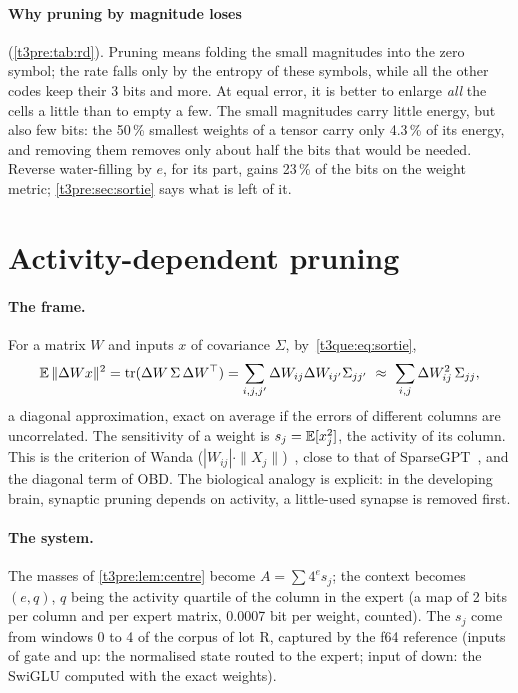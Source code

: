 \paragraph{Why pruning by magnitude loses} (\cref{t3pre:tab:rd}). Pruning means folding the small magnitudes into the zero symbol; the rate falls only by the entropy of these symbols, while all the other codes keep their 3 bits and more. At equal error, it is better to enlarge \emph{all} the cells a little than to empty a few. The small magnitudes carry little energy, but also few bits: the 50\,\% smallest weights of a tensor carry only 4.3\,\% of its energy, and removing them removes only about half the bits that would be needed. Reverse water-filling by $e$, for its part, gains 23\,\% of the bits on the weight metric; \cref{t3pre:sec:sortie} says what is left of it.

\section{Activity-dependent pruning}\label{t3pre:sec:activite}

\paragraph{The frame.} For a matrix $W$ and inputs $x$ of covariance $\Sigma$, by~\eqref{t3que:eq:sortie},
\begin{equation}\label{t3pre:eq:diag}
\E\,\|\Delta W x\|^2 = \mathrm{tr}(\Delta W\, \Sigma\, \Delta W^\top) = \sum_{i,j,j'} \Delta W_{ij}\Delta W_{ij'}\Sigma_{jj'} \ \approx\ \sum_{i,j} \Delta W_{ij}^2\, \Sigma_{jj},
\end{equation}
a diagonal approximation, exact on average if the errors of different columns are uncorrelated. The sensitivity of a weight is $s_j = \mathbb{E}[x_j^2]$, the activity of its column. This is the criterion of Wanda ($|W_{ij}|\cdot\|X_j\|$)~\cite{genome-pe-sun2023wanda}, close to that of SparseGPT~\cite{genome-pe-frantar2023sparsegpt}, and the diagonal term of OBD. The biological analogy is explicit: in the developing brain, synaptic pruning depends on activity, a little-used synapse is removed first.

\paragraph{The system.} The masses of \cref{t3pre:lem:centre} become $A = \sum 4^{e} s_j$; the context becomes $(e, q)$, $q$ being the activity quartile of the column in the expert (a map of 2 bits per column and per expert matrix, 0.0007 bit per weight, counted). The $s_j$ come from windows 0 to 4 of the corpus of lot R, captured by the f64 reference (inputs of gate and up: the normalised state routed to the expert; input of down: the SwiGLU computed with the exact weights).

